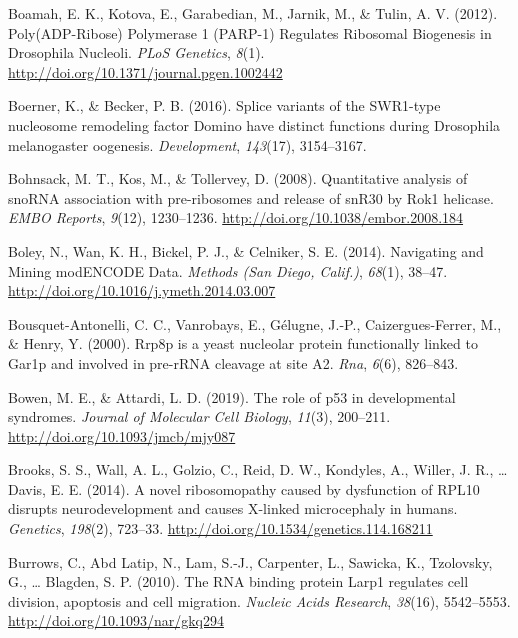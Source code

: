 \documentclass[12pt,twoside]{reedthesis}
\newlength{\cslhangindent}
\newenvironment{cslreferences}%
  {\setlength{\parindent}{0pt}%
  \everypar{\setlength{\hangindent}{\cslhangindent}}\ignorespaces}%
  {\par}
\begin{document}
\begin{cslreferences}
\leavevmode\hypertarget{ref-boamahPolyADPRibosePolymerase2012}{}%
Boamah, E. K., Kotova, E., Garabedian, M., Jarnik, M., \& Tulin, A. V. (2012). Poly(ADP-Ribose) Polymerase 1 (PARP-1) Regulates Ribosomal Biogenesis in Drosophila Nucleoli. \emph{PLoS Genetics}, \emph{8}(1). \url{http://doi.org/10.1371/journal.pgen.1002442}

\leavevmode\hypertarget{ref-Boerner2016}{}%
Boerner, K., \& Becker, P. B. (2016). Splice variants of the SWR1-type nucleosome remodeling factor Domino have distinct functions during Drosophila melanogaster oogenesis. \emph{Development}, \emph{143}(17), 3154--3167.

\leavevmode\hypertarget{ref-bohnsackQuantitativeAnalysisSnoRNA2008}{}%
Bohnsack, M. T., Kos, M., \& Tollervey, D. (2008). Quantitative analysis of snoRNA association with pre-ribosomes and release of snR30 by Rok1 helicase. \emph{EMBO Reports}, \emph{9}(12), 1230--1236. \url{http://doi.org/10.1038/embor.2008.184}

\leavevmode\hypertarget{ref-boleyNavigatingMiningModENCODE2014}{}%
Boley, N., Wan, K. H., Bickel, P. J., \& Celniker, S. E. (2014). Navigating and Mining modENCODE Data. \emph{Methods (San Diego, Calif.)}, \emph{68}(1), 38--47. \url{http://doi.org/10.1016/j.ymeth.2014.03.007}

\leavevmode\hypertarget{ref-Bousquet-Antonelli2000a}{}%
Bousquet-Antonelli, C. C., Vanrobays, E., Gélugne, J.-P., Caizergues-Ferrer, M., \& Henry, Y. (2000). Rrp8p is a yeast nucleolar protein functionally linked to Gar1p and involved in pre-rRNA cleavage at site A2. \emph{Rna}, \emph{6}(6), 826--843.

\leavevmode\hypertarget{ref-bowenRoleP53Developmental2019}{}%
Bowen, M. E., \& Attardi, L. D. (2019). The role of p53 in developmental syndromes. \emph{Journal of Molecular Cell Biology}, \emph{11}(3), 200--211. \url{http://doi.org/10.1093/jmcb/mjy087}

\leavevmode\hypertarget{ref-Brooks2014b}{}%
Brooks, S. S., Wall, A. L., Golzio, C., Reid, D. W., Kondyles, A., Willer, J. R., \ldots{} Davis, E. E. (2014). A novel ribosomopathy caused by dysfunction of RPL10 disrupts neurodevelopment and causes X-linked microcephaly in humans. \emph{Genetics}, \emph{198}(2), 723--33. \url{http://doi.org/10.1534/genetics.114.168211}

\leavevmode\hypertarget{ref-burrowsRNABindingProtein2010}{}%
Burrows, C., Abd Latip, N., Lam, S.-J., Carpenter, L., Sawicka, K., Tzolovsky, G., \ldots{} Blagden, S. P. (2010). The RNA binding protein Larp1 regulates cell division, apoptosis and cell migration. \emph{Nucleic Acids Research}, \emph{38}(16), 5542--5553. \url{http://doi.org/10.1093/nar/gkq294}


\end{cslreferences}
\end{document}
